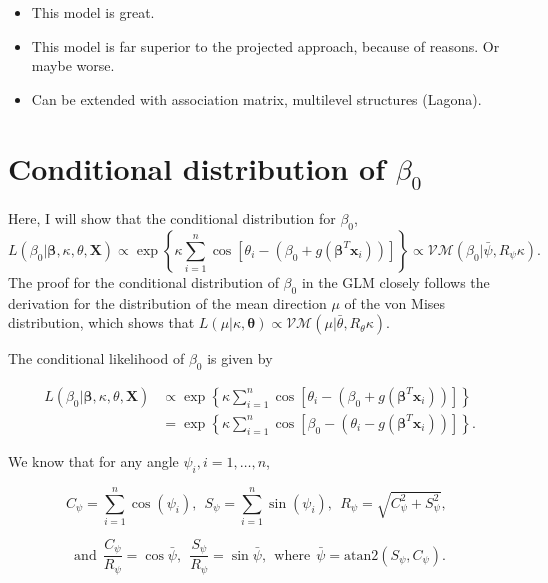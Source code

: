 \documentclass[12pt,a4paper]{article}\usepackage[]{graphicx}\usepackage[]{color}
\begin{document}
\begin{itemize}
\item This model is great.
\item This model is far superior to the projected approach, because of reasons. Or maybe worse.
\item Can be extended with association matrix, multilevel structures (Lagona).
\end{itemize}







\appendix

\section{Conditional distribution of $\beta_0$} \label{beta0}

Here, I will show that the conditional distribution for $\beta_0$,
$$ L(\beta_0 \vert \boldsymbol\beta, \kappa, \theta, \boldsymbol{X}) \propto \exp \left\lbrace \kappa \sum_{i=1}^n \cos \left[ \theta_i - (\beta_0 + g(\boldsymbol\beta^T \boldsymbol{x}_i)) \right]  \right\rbrace \propto \mathcal{VM}(\beta_0 \vert \bar\psi, R_{\psi}\kappa). $$
The proof for the conditional distribution of $\beta_0$ in the GLM closely follows the derivation for the distribution of the mean direction $\mu$ of the von Mises distribution, which shows that $L(\mu \vert \kappa, \boldsymbol\theta) \propto \mathcal{VM}(\mu \vert \bar\theta, R_{\theta} \kappa)$.

The conditional likelihood of $\beta_0$ is given by

\begin{align*}
L(\beta_0 \vert \boldsymbol\beta, \kappa, \theta, \boldsymbol{X}) & \propto \exp \left\lbrace \kappa \sum_{i=1}^n \cos \left[ \theta_i - (\beta_0 + g(\boldsymbol\beta^T \boldsymbol{x}_i)) \right] \right\rbrace \\
& = \exp \left\lbrace \kappa \sum_{i=1}^n \cos \left[ \beta_0 - (\theta_i - g(\boldsymbol\beta^T \boldsymbol{x}_i)) \right]  \right\rbrace.
\end{align*}

We know that for any angle $\psi_i, i = 1, \dots, n$,

$$ C_{\psi} = \sum_{i=1}^n \cos(\psi_i), ~~ S_{\psi} = \sum_{i=1}^n \sin(\psi_i), ~~ R_{\psi} = \sqrt{C_{\psi}^2 + S_{\psi}^2}, ~~ $$

$$ \text{and} ~~ \frac{C_{\psi}}{R_{\psi}} = \cos \bar\psi, ~~ \frac{S_{\psi}}{R_{\psi}} = \sin \bar\psi, ~~ \text{where} ~~ \bar\psi = \text{atan2}(S_{\psi}, C_{\psi}). $$
\end{document}
